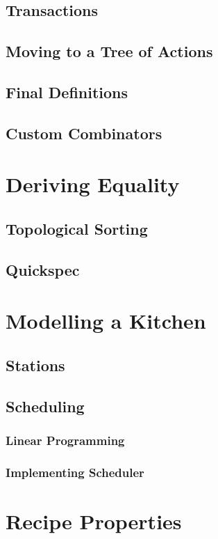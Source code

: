 \documentclass[11pt]{article}
\begin{document}
        \subsection{Transactions}
        \subsection{Moving to a Tree of Actions}
        \subsection{Final Definitions}
        \subsection{Custom Combinators}

    \section{Deriving Equality}
        \subsection{Topological Sorting}
        \subsection{Quickspec}
    
    \section{Modelling a Kitchen}
        \subsection{Stations}
        \subsection{Scheduling}
            \subsubsection{Linear Programming}
            \subsubsection{Implementing Scheduler}
        
    \section{Recipe Properties}
\end{document}
